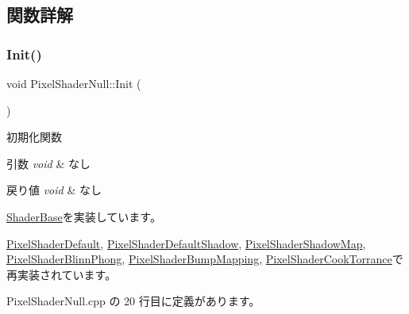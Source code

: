 \subsection{関数詳解}
\mbox{\label{class_pixel_shader_null_a5318be2bf26892c385d863e3e8409571}} 
\subsubsection{\texorpdfstring{Init()}{Init()}}
{\footnotesize\ttfamily void Pixel\+Shader\+Null\+::\+Init (\begin{DoxyParamCaption}{ }\end{DoxyParamCaption})\hspace{0.3cm}{\ttfamily [virtual]}}



初期化関数 


\begin{DoxyParams}{引数}
{\em void} & なし \\
\hline
\end{DoxyParams}

\begin{DoxyRetVals}{戻り値}
{\em void} & なし \\
\hline
\end{DoxyRetVals}


\mbox{\hyperlink{class_shader_base_a9622b2f5e0184a78d3af82820dc5113d}{Shader\+Base}}を実装しています。



\mbox{\hyperlink{class_pixel_shader_default_a74187e4e936d79947753bf4028a411bf}{Pixel\+Shader\+Default}}, \mbox{\hyperlink{class_pixel_shader_default_shadow_a22be67e887bcad8d9b6725cbae7e3abc}{Pixel\+Shader\+Default\+Shadow}}, \mbox{\hyperlink{class_pixel_shader_shadow_map_a4e68df44391fdd93985ad7b361828f99}{Pixel\+Shader\+Shadow\+Map}}, \mbox{\hyperlink{class_pixel_shader_blinn_phong_af02b6b6659975f0285aebced953c567a}{Pixel\+Shader\+Blinn\+Phong}}, \mbox{\hyperlink{class_pixel_shader_bump_mapping_ab7807b7c56242e965ddb23e66e1a5d9e}{Pixel\+Shader\+Bump\+Mapping}}, \mbox{\hyperlink{class_pixel_shader_cook_torrance_aed6d21d6560d11fede08e596f49716d5}{Pixel\+Shader\+Cook\+Torrance}}で再実装されています。



 Pixel\+Shader\+Null.\+cpp の 20 行目に定義があります。

